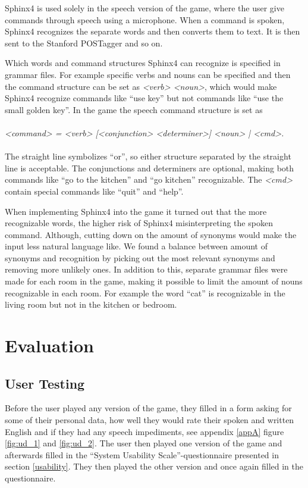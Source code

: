 Sphinx4 is used solely in the speech version of the game, where the user give commands through speech using a microphone. When a command is spoken, Sphinx4 recognizes the separate words and then converts them to text. It is then sent to the Stanford POSTagger and so on.

Which words and command structures Sphinx4 can recognize is specified in grammar files. For example specific verbs and nouns can be specified and then the command structure can be set as \textit{<verb> <noun>}, which would make Sphinx4 recognize commands like ``use key'' but not commands like ``use the small golden key''. In the game the speech command structure is set as
\\
\\
\textit{<command> = <verb> [<conjunction> <determiner>] <noun> | <cmd>.}
\\
\\
The straight line symbolizes ``or'', so either structure separated by the straight line is acceptable. The conjunctions and determiners are optional, making both commands like ``go to the kitchen'' and ``go kitchen'' recognizable. The \textit{<cmd>} contain special commands like ``quit'' and ``help''.

When implementing Sphinx4 into the game it turned out that the more recognizable words, the higher risk of Sphinx4 misinterpreting the spoken command. Although, cutting down on the amount of synonyms would make the input less natural language like. We found a balance between amount of synonyms and recognition by picking out the most relevant synonyms and removing more unlikely ones. In addition to this, separate grammar files were made for each room in the game, making it possible to limit the amount of nouns recognizable in each room. For example the word ``cat'' is recognizable in the living room but not in the kitchen or bedroom.

\section{Evaluation}
\subsection{User Testing}
Before the user played any version of the game, they filled in a form asking for some of their personal data, how well they would rate their spoken and written English and if they had any speech impediments, see appendix \ref{appA} figure \ref{fig:ud_1} and \ref{fig:ud_2}. The user then played one version of the game and afterwards filled in the ``System Usability Scale''-questionnaire presented in section \ref{usability}. They then played the other version and once again filled in the questionnaire.

